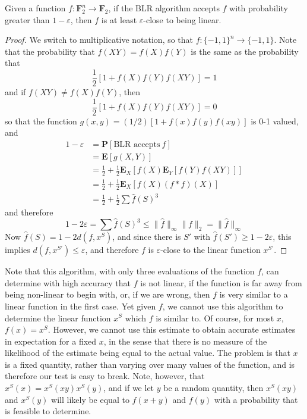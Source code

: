 \begin{theorem}
    Given a function $f: \mathbf{F}_2^n \to \mathbf{F}_2$, if the BLR algorithm accepts $f$ with probability greater than $1 - \varepsilon$, then $f$ is at least $\varepsilon$-close to being linear.
\end{theorem}
\begin{proof}
    We switch to multiplicative notation, so that $f: \{ -1, 1 \}^n \to \{ -1, 1 \}$. Note that the probability that $f(XY) = f(X)f(Y)$ is the same as the probability that
    \[ \frac{1}{2} [1 + f(X)f(Y)f(XY)] = 1 \]
    and if $f(XY) \neq f(X) f(Y)$, then
    \[ \frac{1}{2} [1 + f(X)f(Y)f(XY)] = 0 \]
    so that the function $g(x,y) = (1/2)[1 + f(x)f(y)f(xy)]$ is 0-1 valued, and
    \begin{align*}
        1 - \varepsilon &= \mathbf{P}[\text{BLR accepts}\ f]\\
        &= \mathbf{E}[g(X,Y)]\\
        &= \frac{1}{2} + \frac{1}{2} \mathbf{E}_X[f(X) \mathbf{E}_Y[f(Y) f(XY)]]\\
        &= \frac{1}{2} + \frac{1}{2} \mathbf{E}_X[f(X) (f * f)(X)]\\
        &= \frac{1}{2} + \frac{1}{2} \sum \widehat{f}(S)^3
    \end{align*}
    and therefore
    \[ 1 - 2 \varepsilon = \sum \widehat{f}(S)^3 \leq \| \widehat{f} \|_\infty \| f \|_2 = \| \widehat{f} \|_\infty \]
    Now $\widehat{f}(S) = 1 - 2 d(f, x^S)$, and since there is $S'$ with $\widehat{f}(S') \geq 1 - 2 \varepsilon$, this implies $d(f, x^{S'}) \leq \varepsilon$, and therefore $f$ is $\varepsilon$-close to the linear function $x^{S'}$.
\end{proof}

Note that this algorithm, with only three evaluations of the function $f$, can determine with high accuracy that $f$ is not linear, if the function is far away from being non-linear to begin with, or, if we are wrong, then $f$ is very similar to a linear function in the first case. Yet given $f$, we cannot use this algorithm to determine the linear function $x^S$ which $f$ is similar to. Of course, for most $x$, $f(x) = x^S$. However, we cannot use this estimate to obtain accurate estimates in expectation for a fixed $x$, in the sense that there is no measure of the likelihood of the estimate being equal to the actual value. The problem is that $x$ is a fixed quantity, rather than varying over many values of the function, and is therefore our test is easy to break. Note, however, that $x^S(x) = x^S(xy)x^S(y)$, and if we let $y$ be a random quantity, then $x^S(xy)$ and $x^S(y)$ will likely be equal to $f(x + y)$ and $f(y)$ with a probability that is feasible to determine.

